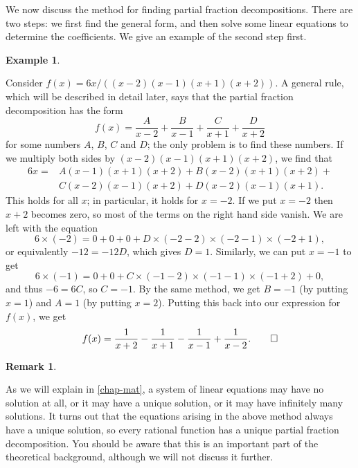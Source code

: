 \documentclass[a4paper]{book}
\newcommand{\tm}        {\times}
\renewcommand{\:}{\colon}
\newcommand{\bilabel}[1]{\hypertarget{#1}{\label{#1}}}
\theoremstyle{definition}
\newtheorem{remark}[theorem]{Remark}
\newtheorem{example}[theorem]{Example}
\begin{document}
We now discuss the method for finding partial fraction
decompositions.  There are two steps: we first find the general form,
and then solve some linear equations to determine the coefficients.
We give an example of the second step first.
\begin{example}\bilabel{eg-pfrac-i}
 Consider $f(x)=6x/((x-2)(x-1)(x+1)(x+2))$.  A general rule, which
 will be described in detail later, says that the partial fraction
 decomposition has the form
 \[ f(x) = \frac{A}{x-2} + \frac{B}{x-1} +
           \frac{C}{x+1} + \frac{D}{x+2}
 \]
 for some numbers $A$, $B$, $C$ and $D$; the only problem is to find
 these numbers.  If we multiply both sides by $(x-2)(x-1)(x+1)(x+2)$,
 we find that
 \begin{align*}
  6x =& A(x-1)(x+1)(x+2) + B(x-2)(x+1)(x+2) +\\
      & C(x-2)(x-1)(x+2) + D(x-2)(x-1)(x+1).
 \end{align*}
 This holds for all $x$; in particular, it holds for $x=-2$.  If we
 put $x=-2$ then $x+2$ becomes zero, so most of the terms on the right
 hand side vanish.  We are left with the equation
 \[ 6\tm (-2) = 0+0+0+D\tm(-2-2)\tm(-2-1)\tm(-2+1), \]
 or equivalently $-12=-12D$, which gives $D=1$.  Similarly, we can put
 $x=-1$ to get
 \[ 6\tm(-1) = 0 + 0 + C\tm(-1-2)\tm(-1-1)\tm(-1+2) + 0, \]
 and thus $-6=6C$, so $C=-1$.  By the same method, we get $B=-1$ (by
 putting $x=1$) and $A=1$ (by putting $x=2$).  Putting this back into
 our expression for $f(x)$, we get
 \[ f(x) =
     \frac{1}{x+2} - \frac{1}{x+1} - \frac{1}{x-1} + \frac{1}{x-2}.
     \qed
 \]
\end{example}
\begin{remark}\bilabel{rem-pfrac-unique}
 As we will explain in \autoref{chap-mat}, a system of linear
 equations may have no solution at all, or it may have a unique
 solution, or it may have infinitely many solutions.  It turns out
 that the equations arising in the above method always have a unique
 solution, so every rational function has a unique partial fraction
 decomposition.  You should be aware that this is an important part of
 the theoretical background, although we will not discuss it further.
\end{remark}
\end{document}

